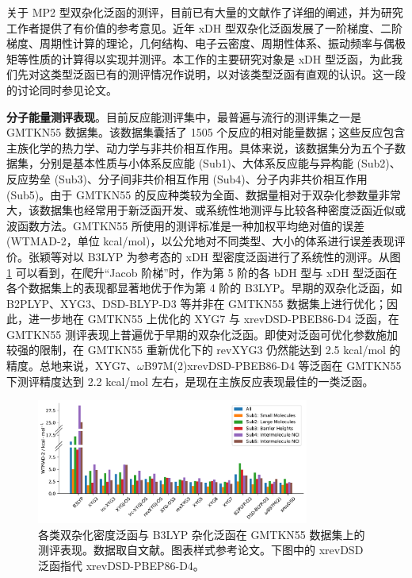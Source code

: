关于 MP2 型双杂化泛函的测评，目前已有大量的文献作了详细的阐述，并为研究工作者提供了有价值的参考意见。近年 xDH 型双杂化泛函发展了一阶梯度、二阶梯度、周期性计算的理论，几何结构、电子云密度、周期性体系、振动频率与偶极矩等性质的计算得以实现并测评。本工作的主要研究对象是 xDH 型泛函，为此我们先对这类型泛函已有的测评情况作说明，以对该类型泛函有直观的认识。这一段的讨论同时参见论文\cite{Gu.Thesis.2020, Yan.Thesis.2022}。

\textbf{分子能量测评表现}。目前反应能测评集中，最普遍与流行的测评集之一是 GMTKN55 数据集\cite{Goerigk-Grimme.PCCP.2017}。该数据集囊括了 1505 个反应的相对能量数据；这些反应包含主族化学的热力学、动力学与非共价相互作用。具体来说，该数据集分为五个子数据集，分别是基本性质与小体系反应能 (Sub1)、大体系反应能与异构能 (Sub2)、反应势垒 (Sub3)、分子间非共价相互作用 (Sub4)、分子内非共价相互作用 (Sub5)。由于 GMTKN55 的反应种类较为全面、数据量相对于双杂化参数量非常大，该数据集也经常用于新泛函开发、或系统性地测评与比较各种密度泛函近似或波函数方法。GMTKN55 所使用的测评标准是一种加权平均绝对值的误差 (WTMAD-2，单位 kcal/mol)，以公允地对不同类型、大小的体系进行误差表现评价。张颖等对以 B3LYP 为参考态的 xDH 型密度泛函进行了系统性的测评\cite{Zhang-Xu.JPCL.2021}。从图 \ref{fig.xdh-b3lyp-wtmad} 可以看到，在爬升“Jacob 阶梯”时，作为第 5 阶的各 bDH 型与 xDH 型泛函在各个数据集上的表现都显著地优于作为第 4 阶的 B3LYP。早期的双杂化泛函，如 B2PLYP、XYG3、DSD-BLYP-D3 等并非在 GMTKN55 数据集上进行优化；因此，进一步地在 GMTKN55 上优化的 XYG7 与 xrevDSD-PBEB86-D4 泛函，在 GMTKN55 测评表现上普遍优于早期的双杂化泛函。即使对泛函可优化参数施加较强的限制，在 GMTKN55 重新优化下的 revXYG3 仍然能达到 2.5 kcal/mol 的精度。总地来说，XYG7、$\omega$B97M(2)xrevDSD-PBEB86-D4 等泛函在 GMTKN55 下测评精度达到 2.2 kcal/mol 左右，是现在主族反应表现最佳的一类泛函。

\begin{figure}[h]
  \centering
  \caption{各类双杂化密度泛函与 B3LYP 杂化泛函在 GMTKN55 数据集上的测评表现。数据取自文献\cite{Zhang-Xu.JPCL.2021}。图表样式参考论文\cite{Yan.Thesis.2022}。下图中的 xrevDSD 泛函指代 xrevDSD-PBEP86-D4。}
  \label{fig.xdh-b3lyp-wtmad}
  \includegraphics[width=0.8\textwidth]{assets/xdh-b3lyp-wtmad.pdf}
\end{figure}

